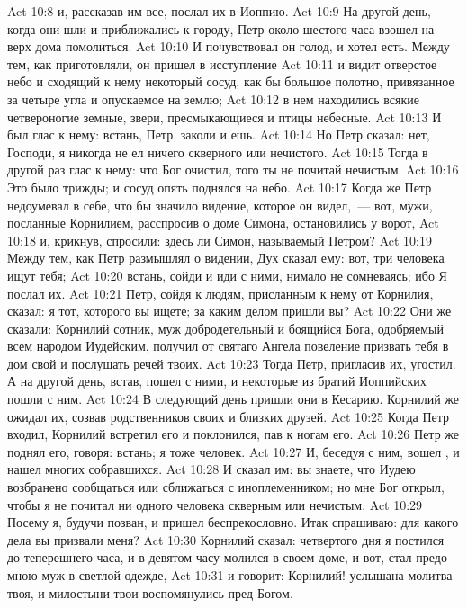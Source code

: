 \vs Act 10:8 и, рассказав им все, послал их в Иоппию.
\rsbpar\vs Act 10:9 На другой день, когда они шли и приближались к городу, Петр около шестого часа взошел на верх дома помолиться.
\vs Act 10:10 И почувствовал он голод, и хотел есть. Между тем, как приготовляли, он пришел в исступление
\vs Act 10:11 и видит отверстое небо и сходящий к нему некоторый сосуд, как бы большое полотно, привязанное за четыре угла и опускаемое на землю;
\vs Act 10:12 в нем находились всякие четвероногие земные, звери, пресмыкающиеся и птицы небесные.
\vs Act 10:13 И был глас к нему: встань, Петр, заколи и ешь.
\vs Act 10:14 Но Петр сказал: нет, Господи, я никогда не ел ничего скверного или нечистого.
\vs Act 10:15 Тогда в другой раз  глас к нему: что Бог очистил, того ты не почитай нечистым.
\vs Act 10:16 Это было трижды; и сосуд опять поднялся на небо.
\vs Act 10:17 Когда же Петр недоумевал в себе, что бы значило видение, которое он видел,~--- вот, мужи, посланные Корнилием, расспросив о доме Симона, остановились у ворот,
\vs Act 10:18 и, крикнув, спросили: здесь ли Симон, называемый Петром?
\vs Act 10:19 Между тем, как Петр размышлял о видении, Дух сказал ему: вот, три человека ищут тебя;
\vs Act 10:20 встань, сойди и иди с ними, нимало не сомневаясь; ибо Я послал их.
\vs Act 10:21 Петр, сойдя к людям, присланным к нему от Корнилия, сказал: я тот, которого вы ищете; за каким делом пришли вы?
\vs Act 10:22 Они же сказали: Корнилий сотник, муж добродетельный и боящийся Бога, одобряемый всем народом Иудейским, получил от святаго Ангела повеление призвать тебя в дом свой и послушать речей твоих.
\vs Act 10:23 Тогда Петр, пригласив их, угостил. А на другой день, встав, пошел с ними, и некоторые из братий Иоппийских пошли с ним.
\rsbpar\vs Act 10:24 В следующий день пришли они в Кесарию. Корнилий же ожидал их, созвав родственников своих и близких друзей.
\vs Act 10:25 Когда Петр входил, Корнилий встретил его и поклонился, пав к ногам его.
\vs Act 10:26 Петр же поднял его, говоря: встань; я тоже человек.
\vs Act 10:27 И, беседуя с ним, вошел , и нашел многих собравшихся.
\vs Act 10:28 И сказал им: вы знаете, что Иудею возбранено сообщаться или сближаться с иноплеменником; но мне Бог открыл, чтобы я не почитал ни одного человека скверным или нечистым.
\vs Act 10:29 Посему я, будучи позван, и пришел беспрекословно. Итак спрашиваю: для какого дела вы призвали меня?
\vs Act 10:30 Корнилий сказал: четвертого дня я постился до теперешнего часа, и в девятом часу молился в своем доме, и вот, стал предо мною муж в светлой одежде,
\vs Act 10:31 и говорит: Корнилий! услышана молитва твоя, и милостыни твои воспомянулись пред Богом.
